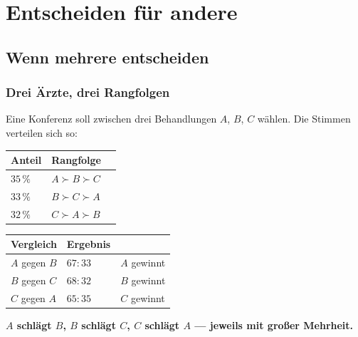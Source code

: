 \part{Entscheiden für andere}

\chapter{Wenn mehrere entscheiden}

\section{Drei Ärzte, drei Rangfolgen}

\begin{merksatz}
Eine Konferenz soll zwischen drei Behandlungen $A$, $B$, $C$ wählen. Die Stimmen verteilen sich so:

\begin{center}
{\small
\renewcommand{\arraystretch}{1.5}
\begin{tabular}{@{}P{2.0cm}P{2.4cm}P{2.4cm}@{}}
\toprule
\textbf{Anteil} & \textbf{Rangfolge} & \\
\midrule
$35\,\%$ & $A \succ B \succ C$ & \\
$33\,\%$ & $B \succ C \succ A$ & \\
$32\,\%$ & $C \succ A \succ B$ & \\
\bottomrule
\end{tabular}}
\end{center}

\begin{center}
{\small
\renewcommand{\arraystretch}{1.48}
\begin{tabular}{@{}P{2.4cm}P{2.6cm}P{2.4cm}@{}}
\toprule
\textbf{Vergleich} & \textbf{Ergebnis} & \\
\midrule
$A$ gegen $B$ & $67 : 33$ & $A$ gewinnt\\
$B$ gegen $C$ & $68 : 32$ & $B$ gewinnt\\
$C$ gegen $A$ & $65 : 35$ & \textcolor{akzent}{$C$ gewinnt}\\
\bottomrule
\end{tabular}}
\end{center}

\begin{center}
\begin{minipage}{0.9\textwidth}
\textbf{$A$ schlägt $B$, $B$ schlägt $C$, $C$ schlägt $A$ --- jeweils mit großer Mehrheit.}
\end{minipage}
\end{center}

\begin{center}
\begin{minipage}{0.88\textwidth}
\end{minipage}
\end{center}
\end{merksatz}

